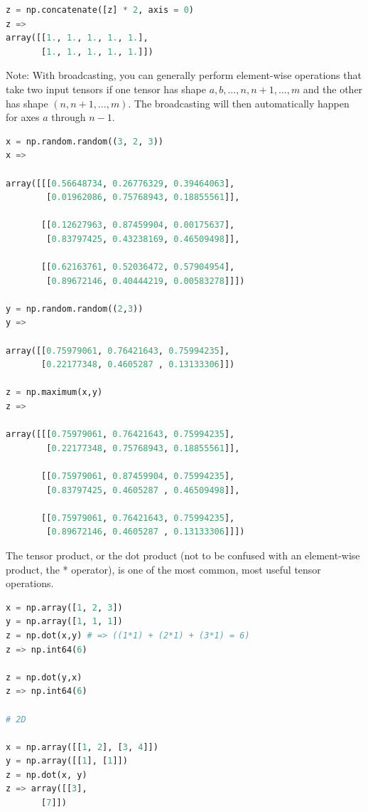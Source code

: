 {\begin{lstlisting}[language=python, breaklines=true]
z = np.concatenate([z] * 2, axis = 0)
z => 
array([[1., 1., 1., 1., 1.],
       [1., 1., 1., 1., 1.]])
\end{lstlisting}
\vs

Note: With broadcasting, you can generally perform element-wise operations that take two input tensors if one tensor has shape ${a,b,\dots,n,n+1,\dots,m}$ and the other has shape $(n,n+1,\dots,m)$. The broadcasting will then automatically happen for axes $a$ through $n-1$.

\vs
\begin{lstlisting}[language=python, breaklines=true]
x = np.random.random((3, 2, 3))
x => 

array([[[0.56648734, 0.26776329, 0.39464063],
        [0.01962086, 0.75768943, 0.18855561]],

       [[0.12627963, 0.87459904, 0.00175637],
        [0.83797425, 0.43238169, 0.46509498]],

       [[0.62163761, 0.52036472, 0.57904954],
        [0.89672146, 0.40444219, 0.00583278]]])

y = np.random.random((2,3))
y =>

array([[0.75979061, 0.76421643, 0.75994235],
       [0.22177348, 0.4605287 , 0.13133306]])

z = np.maximum(x,y)
z =>

array([[[0.75979061, 0.76421643, 0.75994235],
        [0.22177348, 0.75768943, 0.18855561]],

       [[0.75979061, 0.87459904, 0.75994235],
        [0.83797425, 0.4605287 , 0.46509498]],

       [[0.75979061, 0.76421643, 0.75994235],
        [0.89672146, 0.4605287 , 0.13133306]]])
\end{lstlisting}
\vs


The tensor product, or the dot product (not to be confused with an element-wise product, the * operator), is one of the most common, most useful tensor operations.

\begin{lstlisting}[language=python, breaklines=true]
x = np.array([1, 2, 3])
y = np.array([1, 1, 1]) 
z = np.dot(x,y) # => ((1*1) + (2*1) + (3*1) = 6)
z => np.int64(6)

z = np.dot(y,x)
z => np.int64(6) 

# 2D

x = np.array([[1, 2], [3, 4]])
y = np.array([[1], [1]])
z = np.dot(x, y)
z => array([[3],
       [7]])


\end{lstlisting}}
